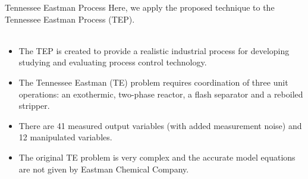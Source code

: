 \documentclass[10pt]{beamer}
\begin{document}
\begin{frame}{Tennessee Eastman Process}
  Here, we apply the proposed technique to the Tennessee Eastman Process (TEP).\\~\\
  \begin{itemize}
  \item The TEP is created to provide a realistic industrial process for developing studying and evaluating process control technology. 
  \item The Tennessee Eastman (TE) problem requires coordination of three unit operations: an exothermic, two-phase reactor, a flash separator and a reboiled  stripper.
  \item There are 41 measured output variables (with added measurement noise) and 12 manipulated variables.
  \item The original TE problem is very complex and the accurate model equations are not given by Eastman Chemical Company.   
  \end{itemize}
\end{frame}
\end{document}
